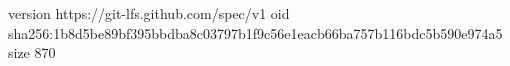 version https://git-lfs.github.com/spec/v1
oid sha256:1b8d5be89bf395bbdba8c03797b1f9c56e1eacb66ba757b116bdc5b590e974a5
size 870
